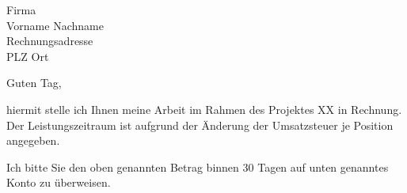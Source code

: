 \documentclass[parskip=half-,ngerman]{scrartcl}
\begin{document}


\begin{letter}{Firma\\Vorname Nachname\\Rechnungsadresse\\PLZ Ort}
	
\opening{Guten Tag,}

hiermit stelle ich Ihnen meine Arbeit im Rahmen des Projektes XX in Rechnung. Der Leistungszeitraum ist aufgrund der Änderung der Umsatzsteuer je Position angegeben.


\PrintInvoiceTabular

Ich bitte Sie den oben genannten Betrag binnen 30 Tagen auf unten genanntes Konto zu überweisen.


	
\end{letter}
\end{document}
